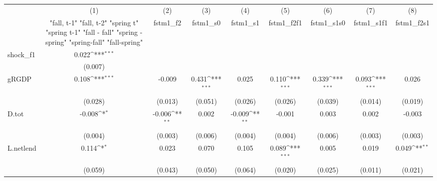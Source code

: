 {
\def\sym#1{\ifmmode^{#1}\else\(^{#1}\)\fi}
\begin{tabular}{l*{8}{c}}
\toprule
            &\multicolumn{1}{c}{(1)}&\multicolumn{1}{c}{(2)}&\multicolumn{1}{c}{(3)}&\multicolumn{1}{c}{(4)}&\multicolumn{1}{c}{(5)}&\multicolumn{1}{c}{(6)}&\multicolumn{1}{c}{(7)}&\multicolumn{1}{c}{(8)}\\
            &\multicolumn{1}{c}{  "fall, t-1" "fall, t-2" "spring t" "spring t-1"  "fall - fall" "spring - spring" "spring-fall" "fall-spring" }&\multicolumn{1}{c}{fstm1\_f2}&\multicolumn{1}{c}{fstm1\_s0}&\multicolumn{1}{c}{fstm1\_s1}&\multicolumn{1}{c}{fstm1\_f2f1}&\multicolumn{1}{c}{fstm1\_s1s0}&\multicolumn{1}{c}{fstm1\_s1f1}&\multicolumn{1}{c}{fstm1\_f2s1}\\
\midrule
shock\_f1    &       0.022\sym{***}&                     &                     &                     &                     &                     &                     &                     \\
            &     (0.007)         &                     &                     &                     &                     &                     &                     &                     \\
\addlinespace
gRGDP       &       0.108\sym{***}&      -0.009         &       0.431\sym{***}&       0.025         &       0.110\sym{***}&       0.339\sym{***}&       0.093\sym{***}&       0.026         \\
            &     (0.028)         &     (0.013)         &     (0.051)         &     (0.026)         &     (0.026)         &     (0.039)         &     (0.014)         &     (0.019)         \\
\addlinespace
D.tot       &      -0.008\sym{*}  &      -0.006\sym{**} &       0.002         &      -0.009\sym{**} &      -0.001         &       0.003         &       0.002         &      -0.003         \\
            &     (0.004)         &     (0.003)         &     (0.006)         &     (0.004)         &     (0.004)         &     (0.006)         &     (0.003)         &     (0.003)         \\
\addlinespace
L.netlend   &       0.114\sym{*}  &       0.023         &       0.070         &       0.105         &       0.089\sym{***}&       0.005         &       0.019         &       0.049\sym{**} \\
            &     (0.059)         &     (0.043)         &     (0.050)         &     (0.064)         &     (0.020)         &     (0.025)         &     (0.011)         &     (0.021)         \\

\end{tabular}}
